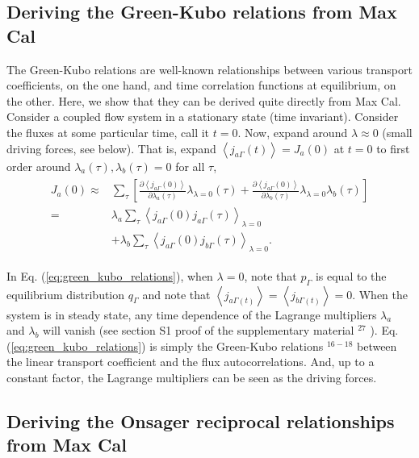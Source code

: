 \documentclass[aps,pra,twocolumn]{revtex4-1}
\begin{document}
\subsection{Deriving the Green-Kubo relations from Max Cal}

The Green-Kubo relations are well-known relationships between various transport coefficients, on the one hand, and time correlation functions at equilibrium, on the other. Here, we show that they can be derived quite directly from Max Cal. Consider a coupled flow system in a stationary state (time invariant). Consider the fluxes at some particular time, call it $t=0$. Now, expand around $\lambda \approx 0$ (small driving forces, see below). That is, expand $\left\langle j_{a \Gamma}(t)\right\rangle=J_a(0)$ at $t=0$ to first order around $\lambda_a(\tau), \lambda_b(\tau)=0$ for all $\tau$,
\begin{eqnarray}
\begin{aligned}
J_a(0) \approx & \sum_\tau\left[\frac{\partial\left\langle j_{a \Gamma}(0)\right\rangle}{\partial \lambda_a(\tau)} \lambda_{\lambda=0}(\tau)+\frac{\partial\left\langle j_{a \Gamma}(0)\right\rangle}{\partial \lambda_b(\tau)} \lambda_{\lambda=0} \lambda_b(\tau)\right] \nonumber \\
= & \lambda_a \sum_\tau\left\langle j_{a \Gamma}(0) j_{a \Gamma}(\tau)\right\rangle_{\lambda=0} \nonumber \\
& +\lambda_b \sum_\tau\left\langle j_{a \Gamma}(0) j_{b \Gamma}(\tau)\right\rangle_{\lambda=0}. \label{eq:green_kubo_relations}
\end{aligned}
\end{eqnarray}

In Eq. (\ref{eq:green_kubo_relations}), when $\lambda=0$, note that $p_{\Gamma}$ is equal to the equilibrium distribution $q_{\Gamma}$ and note that $\left\langle j_{a \Gamma(t)}\right\rangle=\left\langle j_{b \Gamma(t)}\right\rangle=0$. When the system is in steady state, any time dependence of the Lagrange multipliers $\lambda_a$ and $\lambda_b$ will vanish (see section S1 proof of the supplementary material ${ }^{27}$ ). Eq. (\ref{eq:green_kubo_relations}) is simply the Green-Kubo relations ${ }^{16-18}$ between the linear transport coefficient and the flux autocorrelations. And, up to a constant factor, the Lagrange multipliers can be seen as the driving forces.

\subsection{Deriving the Onsager reciprocal relationships from Max Cal}
\end{document}
